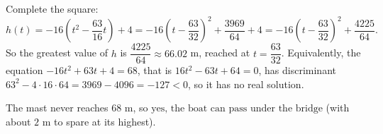 Complete the square:
\[
h(t)=-16\left(t^2-\dfrac{63}{16}t\right)+4=-16\left(t-\dfrac{63}{32}\right)^2+\dfrac{3969}{64}+4=-16\left(t-\dfrac{63}{32}\right)^2+\dfrac{4225}{64}.
\]
So the greatest value of $h$ is $\dfrac{4225}{64}\approx66.02$ m, reached at $t=\dfrac{63}{32}$. Equivalently, the equation $-16t^2+63t+4=68$, that is $16t^2-63t+64=0$, has discriminant $63^2-4\cdot16\cdot64=3969-4096=-127<0$, so it has no real solution.

The mast never reaches $68$ m, so $\boxed{\text{yes, the boat can pass under the bridge}}$ (with about $2$ m to spare at its highest).
